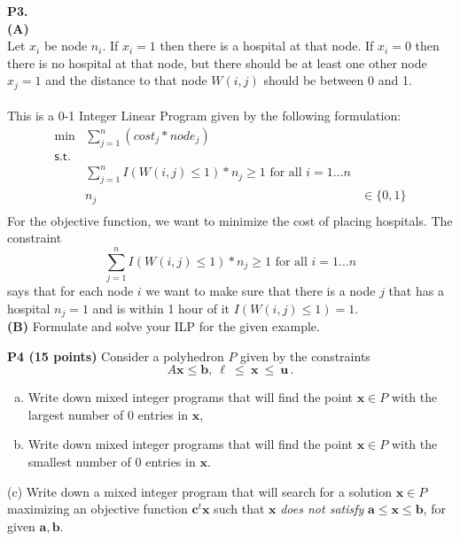 \documentclass[11pt]{article}
\begin{document}
\medskip

\newpage
\noindent\textbf{P3.}
\\
\noindent\textbf{(A)}
\\
Let $x_i$ be node $n_i$.  If $x_i = 1$ then there is a hospital at that node.  If $x_i = 0$ then there is no hospital at that node, but there should be at least one other node $x_j = 1$ and the distance to that node $W(i,j)$ should be between 0 and 1.\\ \\
This is a 0-1 Integer Linear Program given by the following formulation:
\[\begin{array}{rlllllllll}
\min & \sum_{j=1}^{n} (cost_j*node_j) \\
\mathsf{s.t. } \\
& \sum_{j=1}^{n} I(W(i,j) \leq 1)*n_j \geq 1 \text{ for all }i = 1...n\\
& n_j & \in \{0,1\} \\
\end{array}\]
For the objective function, we want to minimize the cost of placing hospitals.
The constraint
$$
\sum_{j=1}^{n} I(W(i,j) \leq 1)*n_j \geq 1 \text{ for all }i = 1...n
$$
says that for each node $i$ we want to make sure that there is a node $j$ that has a hospital $n_j = 1$ and is within 1 hour of it $I(W(i,j) \leq 1) = 1$. \\

\noindent\textbf{(B)} Formulate and solve your ILP for the given example.

\medskip

\noindent\textbf{P4 (15 points)} Consider a polyhedron $P$ given
by the constraints
 \[ A \mathbf{x} \leq \mathbf{b},\ \mathbf{\ell}\ \leq\ \mathbf{x}\ \leq\ \mathbf{u}\,. \]


\begin{enumerate}[(a)]
\item  Write down mixed integer programs that will find the
point $\mathbf{x} \in P$ with the largest number of
$0$ entries in $\mathbf{x}$, 
\item Write down mixed integer programs that will find the
point $\mathbf{x} \in P$ with the smallest number of $0$ entries in $\mathbf{x}$.
\end{enumerate}

\noindent (c) Write down a mixed integer program that will search for a solution
$\mathbf{x} \in P$ maximizing an objective function $\mathbf{c}^t \mathbf{x}$ 
such that $\mathbf{x}$ \emph{does not satisfy}
$\mathbf{a} \leq \mathbf{x} \leq \mathbf{b}$, for given $\mathbf{a}, \mathbf{b}$.
\end{document}
